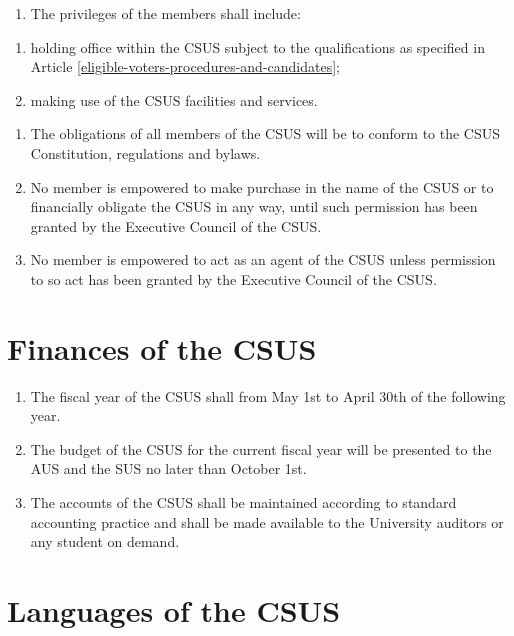 \begin{enumerate}
\def\labelenumi{\arabic{enumi}.}
\setcounter{enumi}{1}
\tightlist
\item
  The privileges of the members shall include:
\end{enumerate}

\begin{enumerate}
\def\labelenumi{(\alph{enumi})}
\tightlist
\item
  holding office within the CSUS subject to the qualifications as
  specified in Article \ref{eligible-voters-procedures-and-candidates};
\item
  making use of the CSUS facilities and services.
\end{enumerate}

\begin{enumerate}
\def\labelenumi{\arabic{enumi}.}
\setcounter{enumi}{2}
\item
  The obligations of all members of the CSUS will be to conform to the
  CSUS Constitution, regulations and bylaws.
\item
  No member is empowered to make purchase in the name of the CSUS or to
  financially obligate the CSUS in any way, until such permission has
  been granted by the Executive Council of the CSUS.
\item
  No member is empowered to act as an agent of the CSUS unless
  permission to so act has been granted by the Executive Council of the
  CSUS.
\end{enumerate}

\section{Finances of the CSUS}\label{finances-of-the-csus}

\begin{enumerate}
\def\labelenumi{\arabic{enumi}.}
\tightlist
\item
  The fiscal year of the CSUS shall from May 1st to April 30th of the following year.
\item
  The budget of the CSUS for the current fiscal year will be presented
  to the AUS and the SUS no later than October 1st.
\item
  The accounts of the CSUS shall be maintained according to standard
  accounting practice and shall be made available to the University
  auditors or any student on demand.
\end{enumerate}

\section{Languages of the CSUS}\label{languages-of-the-csus}

